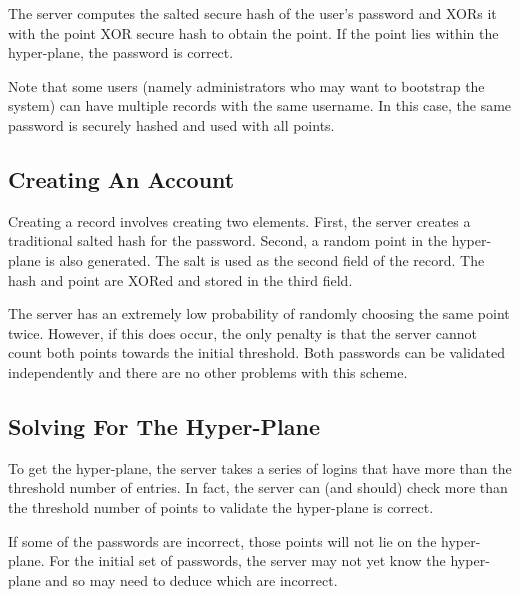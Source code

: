 The server computes the salted secure hash of the user's password and
XORs it with the point XOR secure hash to obtain the point.   If the
point lies within the hyper-plane, the password is correct.   

Note that some users (namely administrators who may want to bootstrap
the system) can have multiple records with the same username.   In this
case, the same password is securely hashed and used with all points.

\subsection{Creating An Account}

Creating a record involves creating two elements.   First, the server 
creates a traditional salted hash for the password.   Second, 
a random point in the hyper-plane is also generated.    The salt is used
as the second field of the record.   The hash and point are XORed and stored
in the third field.

The server has an extremely low probability of randomly choosing the same
point twice.   However, if this does occur, the only penalty is that the
server cannot count both points towards the initial threshold.   Both
passwords can be validated independently and there are no other problems
with this scheme.



\subsection{Solving For The Hyper-Plane}

To get the hyper-plane, the server takes a series of logins that have more than
the threshold number of entries.   In fact, the server can (and should) check
more than the threshold number of points to validate the hyper-plane is
correct.   

If some of the passwords are incorrect, those points will not lie on the 
hyper-plane.   For the initial set of passwords, the server may not
yet know the hyper-plane and so may need to deduce which are incorrect.

